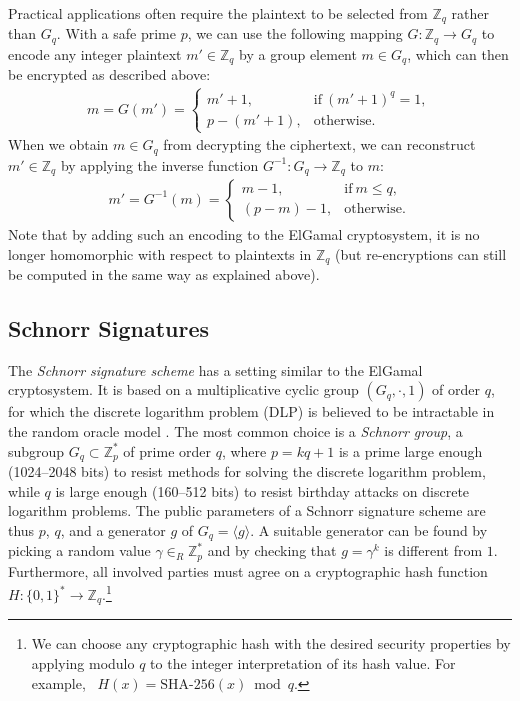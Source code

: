 \documentclass[bibtotoc,halfparskip,oneside]{scrreprt}
\begin{document}
Practical applications often require the plaintext to be selected from $\mathbb{Z}_q$ rather than $G_q$. With a safe prime $p$, we can use the following mapping $G:\mathbb{Z}_q\rightarrow G_q$ to encode any integer plaintext $m'\in\mathbb{Z}_q$ by a group element $m\in G_q$, which can then be encrypted as described above:
\begin{align}
	m=G(m')=
	\begin{cases}
		m'+1,&  \text{if}~ (m'+1)^q=1,\\
		p-(m'+1),&  \text{otherwise}.
	\end{cases}
\end{align}
When we obtain $m\in G_q$ from decrypting the ciphertext, we can reconstruct $m'\in\mathbb{Z}_q$ by applying the inverse function $G^{-1}:G_q \rightarrow \mathbb{Z}_q$ to $m$:
\begin{align}
	m'=G^{-1}(m)=
	\begin{cases}
		m-1,&  \text{if}~ m \leq q,\\
		(p-m)-1,&  \text{otherwise}.
	\end{cases}
\end{align}
Note that by adding such an encoding to the ElGamal cryptosystem, it is no longer homomorphic with respect to plaintexts in $\mathbb{Z}_q$ (but re-encryptions can still be computed in the same way as explained above).

\subsection{Schnorr Signatures} 

The \emph{Schnorr signature scheme} has a setting similar to the ElGamal cryptosystem. It is based on a multiplicative cyclic group $(G_q,\cdot,1)$ of order $q$, for which the discrete logarithm problem (DLP) is believed to be intractable in the random oracle model \cite{schnorr91}. The most common choice is a \emph{Schnorr group}, a subgroup $G_q\subset\mathbb{Z}_p^*$ of prime order $q$, where $p=kq+1$ is a  prime large enough (1024--2048 bits) to resist methods for solving the discrete logarithm problem, while $q$ is large enough (160--512 bits) to resist birthday attacks on discrete logarithm problems. The public parameters of a Schnorr signature scheme are thus $p$, $q$, and a generator $g$ of $G_q=\langle g\rangle$. A suitable generator can be found by picking a random value $\gamma\in_R\mathbb{Z}_p^*$ and by checking that $g=\gamma^k$ is different from $1$. Furthermore, all involved parties must agree on a cryptographic hash function $H:\{0,1\}^*\rightarrow \mathbb{Z}_q$.\footnote{We can choose any cryptographic hash with the desired security properties by applying modulo $q$ to the integer interpretation of its hash value. For example, \ $H(x)=\mathrm{SHA\text{-}256}(x)\bmod{q}$.}
\end{document}
